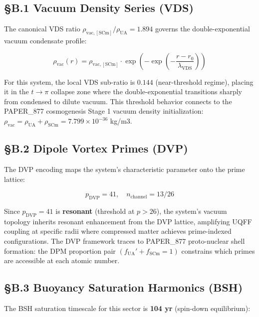 \documentclass[12pt,a4paper]{article}
\begin{document}
\subsection{\S{}B.1 Vacuum Density Series (VDS)}

The canonical VDS ratio $\rho_{\mathrm{vac,[SCm]}} / \rho_{\mathrm{UA}} = 1.894$ governs the double-exponential vacuum condensate profile:

\begin{equation}
\rho_{\mathrm{vac}}(r) = \rho_{\mathrm{vac,[SCm]}} \cdot \exp\!\left(-\exp\!\left(-\frac{r - r_0}{\lambda_{\mathrm{VDS}}}\right)\right)
\end{equation}

For this system, the local VDS sub-ratio is $0.144$ (near-threshold regime), placing it in the $t \to \pi$ collapse zone where the double-exponential transitions sharply from condensed to dilute vacuum. This threshold behavior connects to the PAPER\_877 cosmogenesis Stage 1 vacuum density initialization: $\rho_{\mathrm{vac}} = \rho_{\mathrm{UA}} + \rho_{\mathrm{SCm}} = 7.799 \times 10^{-36}$ kg/m3.

\subsection{\S{}B.2 Dipole Vortex Primes (DVP)}

The DVP encoding maps the system's characteristic parameter onto the prime lattice:

\begin{equation}
p_{\mathrm{DVP}} = 41, \quad n_{\mathrm{channel}} = 13/26
\end{equation}

Since $p_{\mathrm{DVP}} = 41$ is \textbf{resonant} (threshold at $p > 26$), the system's vacuum topology inherits resonant enhancement from the DVP lattice, amplifying UQFF coupling at specific radii where compressed matter achieves prime-indexed configurations. The DVP framework traces to PAPER\_877 proto-nuclear shell formation: the DPM proportion pair $(f_{\mathrm{UA}}' + f_{\mathrm{SCm}} = 1)$ constrains which primes are accessible at each atomic number.

\subsection{\S{}B.3 Buoyancy Saturation Harmonics (BSH)}

The BSH saturation timescale for this sector is \textbf{104 yr} (spin-down equilibrium):
\end{document}

